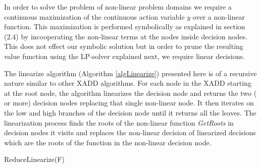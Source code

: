 \documentclass[twoside,11pt]{article}
\begin{document}
In order to solve the problem of non-linear problem domains we require a continuous maximization of the continuous action variable $y$ over a non-linear function. This maximization is performed symbolically as explained in section (2.4) by incooperating the non-linear terms at the nodes inside decision nodes. This does not effect our symbolic solution but in order to prune the resulting value function  using the LP-solver explained next, we require linear decisions. 

The linearize algorithm (Algorithm \ref{algLinearize}) presented here is of a recursive nature similar to other XADD algorithms. For each node in the XADD starting at the root node, the algorithm linearizes the decision node and returns the two ( or more) decision nodes replacing that single non-linear node. It then  iterates on the low and high branches of the decision node until it returns all the leaves. The linearization process finds the roots of the non-linear function \emph{GetRoots} in decision nodes it visits and replaces the non-linear decision of linearized decisions which are the roots of the function in the non-linear decision node. 			
\incmargin{1em}
\linesnumbered
\begin{algorithm}[t!]

\BlankLine
{}
\caption{{\sc ReduceLinearize}(F)  \label{algLinearize}}
\end{algorithm}
\decmargin{1em}
%
\end{document}
